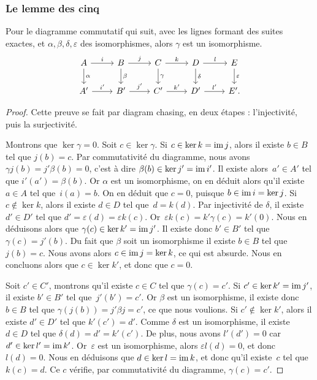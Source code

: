 \subsubsection{Le lemme des cinq}
\begin{lemma}
Pour le diagramme commutatif qui suit, avec les lignes formant des suites exactes, et $\alpha,\beta,\delta,\varepsilon$ des isomorphismes, alors $\gamma$ est un isomorphisme.
\[\begin{tikzcd}
A\arrow[d, "\alpha"]\arrow[r, "i"]&B\arrow[d, "\beta"]\arrow[r, "j"]&C\arrow[d, "\gamma"]\arrow[r, "k"]&D\arrow[d,"\delta"]\arrow[r, "l"]&E\arrow[d,"\varepsilon"]\\
A'\arrow[r, "i'"]&B'\arrow[r, "j'"]&C'\arrow[r, "k'"]&D'\arrow[r, "l'"]&E'.
\end{tikzcd}\]
\end{lemma}
\begin{proof}
Cette preuve se fait par diagram chasing, en deux étapes : l'injectivité, puis la surjectivité.

Montrons que $\ker\gamma=0$. Soit $c\in \ker\gamma$. Si $c\in \ker k=\mathrm{im}\, j$, alors il existe $b\in B$ tel que $j(b)=c$. Par commutativité du diagramme, nous avons $\gamma j(b)=j'\beta(b)=0$, c'est à dire $\beta(b)\in\ker j'=\mathrm{im}\, i'$. Il existe alors~$a'\in A'$ tel que $i'(a')=\beta(b)$. Or $\alpha$ est un isomorphisme, on en déduit alors qu'il existe~$a\in A$ tel que~$i(a)=b$. On en déduit que $c=0$, puisque $b\in \mathrm{im}\, i=\ker j$. Si $c\notin\ker k$, alors il  existe $d\in D$ tel que~$d=k(d)$. Par injectivité de $\delta$, il existe $d'\in D'$ tel que $d'=\varepsilon(d)=\varepsilon k(c)$. Or~$\varepsilon k(c)=k'\gamma(c)=k'(0)$. Nous en déduisons alors que $\gamma(c)\in\ker k'=\mathrm{im}\, j'$. Il existe donc $b'\in B'$ tel que $\gamma(c)=j'(b)$. Du fait que $\beta$ soit un isomorphisme il existe $b\in B$ tel que $j(b)=c$. Nous avons alors $c\in\mathrm{im}\, j=\ker k$, ce qui est absurde. Nous en concluons alors que $c\in \ker k'$, et donc que $c=0$.

Soit $c'\in C'$, montrons qu'il existe $c\in C$ tel que $\gamma(c)=c'$. Si $c'\in\ker k'=\mathrm{im}\, j'$, il existe $b'\in B'$ tel que~$j'(b')=c'$. Or $\beta$ est un isomorphisme, il existe donc $b\in B$ tel que $\gamma(j(b))=j'\beta j=c'$, ce que nous voulions. Si $c'\notin\ker k'$, alors il existe $d'\in D'$ tel que $k'(c')=d'$. Comme $\delta$ est un isomorphisme, il existe $d\in D$ tel que $\delta(d)=d'=k'(c')$. De plus, nous avons $l'(d')=0$ car $d'\in\ker l'=\mathrm{im}\, k'$. Or~$\varepsilon$ est un isomorphisme, alors $\varepsilon l(d)=0$, et donc $l(d)=0$. Nous en déduisons que $d\in\ker l=\mathrm{im}\, k$, et donc qu'il existe~$c$ tel que $k(c)=d$. Ce $c$ vérifie, par commutativité du diagramme, $\gamma(c)=c'$.
\end{proof}

